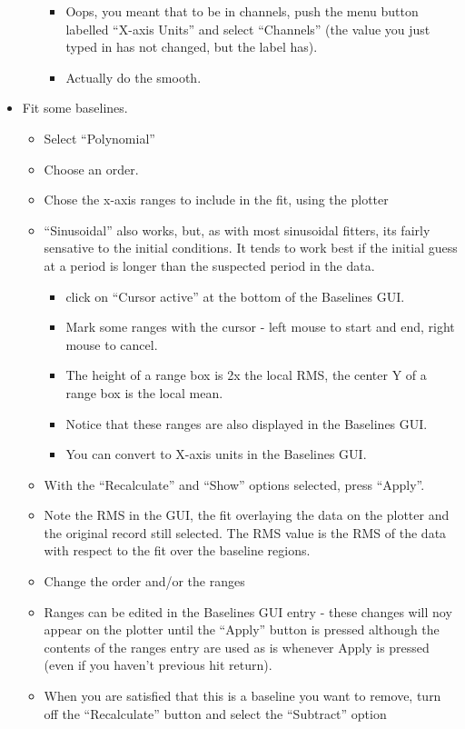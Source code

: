 \begin{itemize}
\begin{itemize}
\begin{itemize}
\item Oops, you meant that to be in channels, push the menu button
labelled ``X-axis Units'' and select ``Channels'' (the value you just
typed in has not changed, but the label has).
\item Actually do the smooth.
\end{itemize}
\end{itemize}
\item Fit some baselines.
\begin{itemize}
\item Select ``Polynomial'' 
\item Choose an order.
\item Chose the x-axis ranges to include in the fit, using the plotter
\item ``Sinusoidal'' also works, but, as with most sinusoidal fitters, its
fairly sensative to the initial conditions.  It tends to work best if
the initial guess at a period is longer than the suspected period in the data.
\begin{itemize}
\item click on ``Cursor active'' at the bottom of the Baselines GUI.
\item Mark some ranges with the cursor - left mouse to start and end, right
mouse to cancel.
\item The height of a range box is 2x the local RMS, the center Y of a 
range box is the local mean.
\item Notice that these ranges are also displayed in the Baselines GUI.
\item You can convert to X-axis units in the Baselines GUI.
\end{itemize}
\item With the ``Recalculate'' and ``Show'' options selected, press ``Apply''.
\item Note the RMS in the GUI, the fit overlaying the data on the 
plotter and the original record still selected.  The RMS value is the
RMS of the data with respect to the fit over the baseline regions.
\item Change the order and/or the ranges
\item Ranges can be edited in the Baselines GUI entry - these changes will
noy appear on the plotter until the ``Apply'' button is pressed although
the contents of the ranges entry are used as is whenever Apply is
pressed (even if you haven't previous hit return).
\item When you are satisfied that this is a baseline you want to remove,
turn off the ``Recalculate'' button and select the ``Subtract'' option

\end{itemize}
\end{itemize}
